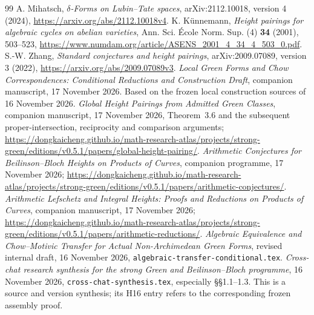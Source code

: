 \documentclass[11pt]{article}
\theoremstyle{definition}
\numberwithin{equation}{section}
\begin{document}
\begin{thebibliography}{99}
 A. Mihatsch, \emph{$\delta$-Forms on Lubin--Tate spaces}, arXiv:2112.10018, version 4 (2024), \url{https://arxiv.org/abs/2112.10018v4}.
 K. K\"unnemann, \emph{Height pairings for algebraic cycles on abelian varieties}, Ann. Sci. \'Ecole Norm. Sup. (4) \textbf{34} (2001), 503--523, \url{https://www.numdam.org/article/ASENS_2001_4_34_4_503_0.pdf}.
 S.-W. Zhang, \emph{Standard conjectures and height pairings}, arXiv:2009.07089, version 3 (2022), \url{https://arxiv.org/abs/2009.07089v3}.
 \emph{Local Green Forms and Chow Correspondences: Conditional Reductions and Construction Draft}, companion manuscript, 17 November 2026. Based on the frozen local construction sources of 16 November 2026.
 \emph{Global Height Pairings from Admitted Green Classes}, companion manuscript, 17 November 2026, Theorem~3.6 and the subsequent proper-intersection, reciprocity and comparison arguments; \url{https://dongkaicheng.github.io/math-research-atlas/projects/strong-green/editions/v0.5.1/papers/global-height-pairing/}.
 \emph{Arithmetic Conjectures for Beilinson--Bloch Heights on Products of Curves}, companion programme, 17 November 2026; \url{https://dongkaicheng.github.io/math-research-atlas/projects/strong-green/editions/v0.5.1/papers/arithmetic-conjectures/}.
 \emph{Arithmetic Lefschetz and Integral Heights: Proofs and Reductions on Products of Curves}, companion manuscript, 17 November 2026; \url{https://dongkaicheng.github.io/math-research-atlas/projects/strong-green/editions/v0.5.1/papers/arithmetic-reductions/}.
 \emph{Algebraic Equivalence and Chow--Motivic Transfer for Actual Non-Archimedean Green Forms}, revised internal draft, 16 November 2026, \texttt{algebraic-transfer-conditional.tex}.
 \emph{Cross-chat research synthesis for the strong Green and Beilinson--Bloch programme}, 16 November 2026, \texttt{cross-chat-synthesis.tex}, especially \S\S1.1--1.3. This is a source and version synthesis; its H16 entry refers to the corresponding frozen assembly proof.
\end{thebibliography}
\end{document}
